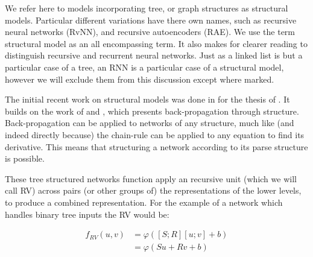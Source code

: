 \documentclass[12pt,parskip]{komatufte}
\begin{document}


We refer here to models incorporating tree, or graph structures as structural models.
Particular different variations have there own names, such as recursive neural networks (RvNN), and recursive autoencoders (RAE).
We use the term structural model as an all encompassing term. 
It also makes for clearer reading to distinguish recursive and recurrent  neural networks.
Just as a linked list is but a particular case of a tree, an RNN is a particular case of a structural model,
however we will exclude them from this discussion except where marked.


The initial recent work on structural models was done in for the thesis of .
It builds on the work of  and , which presents back-propagation through structure.
Back-propagation can be applied to networks of any structure, much like (and indeed directly because) the chain-rule can be applied to any equation to find its derivative.
This means that structuring a network according to its parse structure is possible.


These tree structured networks function apply an recursive unit (which we will call RV) across pairs (or other groups of) the representations of the lower levels, to produce a combined representation.
For the example of a network which handles binary tree inputs the RV would be:

\begin{align}
	f_{RV}(u, v) &= \varphi\left( [S;R][u;v] + b \right) \\ \label{equ:rnn1}
			     &= \varphi\left( Su +Rv + b \right)
\end{align}
\end{document}
